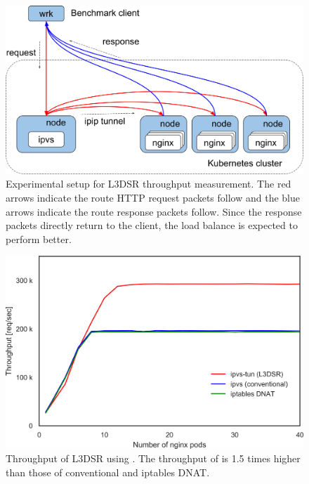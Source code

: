\begin{figure}[h]
  \centering
  \includegraphics[width=0.8\columnwidth]{Figs/benchmark-schem-dsr}
  \par\bigskip
  \centering
  \begin{minipage}{0.9\columnwidth}
    \caption[Experimental setup for L3DSR throughput measurement]{
      Experimental setup for L3DSR throughput measurement.
      The red arrows indicate the route HTTP request packets follow and the blue arrows indicate the route response packets follow.
      Since the response packets directly return to the client, the load balance is expected to perform better.
    }
    \label{fig:benchmark-schem-dsr}
  \end{minipage}
\end{figure}

\begin{figure}[h]
  \centering
  \includegraphics[width=0.75\columnwidth]{Figs/ipvs_l3dsr_1g.png}
  \par\bigskip
  \centering
  \begin{minipage}{0.9\columnwidth}
    \caption[Throughput of L3DSR using IPVS-TUN.]{
      Throughput of L3DSR using .
      The throughput of  is 1.5 times higher than those of conventional  and iptables DNAT.
    }
    \label{fig:ipvs_l3dsr_1g.png}
  \end{minipage}
\end{figure}

